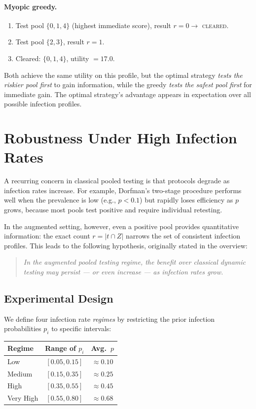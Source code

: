 \documentclass[11pt]{article}
\begin{document}
\paragraph{Myopic greedy.}
\begin{enumerate}
    \item Test pool $\{0,1,4\}$ (highest immediate score), result $r = 0 \to$ \textsc{cleared}.
    \item Test pool $\{2,3\}$, result $r = 1$.
    \item Cleared: $\{0, 1, 4\}$, utility $= 17.0$.
\end{enumerate}

Both achieve the same utility on this profile, but the optimal strategy
\emph{tests the riskier pool first} to gain information, while the greedy
\emph{tests the safest pool first} for immediate gain. The optimal strategy's
advantage appears in expectation over all possible infection profiles.


\section{Robustness Under High Infection Rates}

A recurring concern in classical pooled testing is that protocols
degrade as infection rates increase. For example, Dorfman's two-stage
procedure performs well when the prevalence is low (e.g., $p < 0.1$)
but rapidly loses efficiency as $p$ grows, because most pools test
positive and require individual retesting.

In the augmented setting, however, even a positive pool provides
quantitative information: the exact count $r = |t \cap Z|$ narrows
the set of consistent infection profiles. This leads to the following
hypothesis, originally stated in the overview:

\begin{quote}
\emph{In the augmented pooled testing regime, the benefit over
classical dynamic testing may persist --- or even increase --- as
infection rates grow.}
\end{quote}

\subsection{Experimental Design}

We define four infection rate \emph{regimes} by restricting the prior
infection probabilities $p_i$ to specific intervals:

\begin{center}
\begin{tabular}{@{}lcc@{}}
\toprule
\textbf{Regime} & \textbf{Range of $p_i$} & \textbf{Avg.\ $p$} \\
\midrule
Low        & $[0.05, 0.15]$ & $\approx 0.10$ \\
Medium     & $[0.15, 0.35]$ & $\approx 0.25$ \\
High       & $[0.35, 0.55]$ & $\approx 0.45$ \\
Very High  & $[0.55, 0.80]$ & $\approx 0.68$ \\
\bottomrule
\end{tabular}
\end{center}
\end{document}

